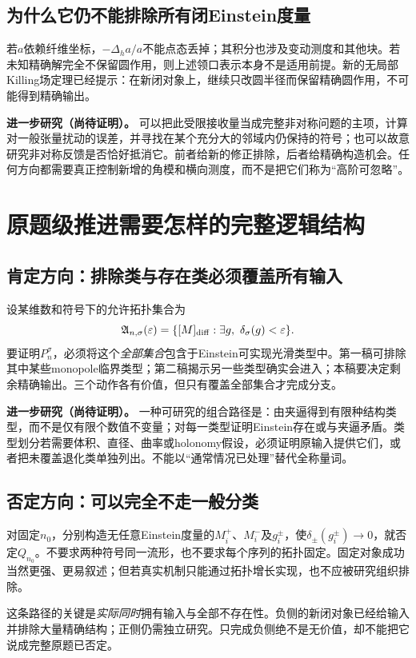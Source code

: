 \documentclass[UTF8,fontset=fandol,zihao=-4]{ctexart}
\theoremstyle{cn}
\newcommand{\newidea}{\par\noindent\textbf{进一步研究（尚待证明）。}}
\begin{document}
\subsection{为什么它仍不能排除所有闭Einstein度量}
若$a$依赖纤维坐标，$-\Delta_h a/a$不能点态丢掉；其积分也涉及变动测度和其他块。若未知精确解完全不保留圆作用，则上述领口表示本身不是适用前提。新的无局部Killing场定理已经提示：在新闭对象上，继续只改圆半径而保留精确圆作用，不可能得到精确输出。

\newidea
可以把此受限接收量当成完整非对称问题的主项，计算对一般张量扰动的误差，并寻找在某个充分大的邻域内仍保持的符号；也可以故意研究非对称反馈是否恰好抵消它。前者给新的修正排除，后者给精确构造机会。任何方向都需要真正控制新增的角模和横向测度，而不是把它们称为“高阶可忽略”。

\section{原题级推进需要怎样的完整逻辑结构}
\subsection{肯定方向：排除类与存在类必须覆盖所有输入}
设某维数和符号下的允许拓扑集合为
\[
 \mathfrak A_{n,\sigma}(\varepsilon)
 =\{[M]_{\rm diff}:\exists g,\ \delta_\sigma(g)<\varepsilon\}.
\]
要证明$P_n^\sigma$，必须将这个\emph{全部集合}包含于Einstein可实现光滑类型中。第一稿可排除其中某些monopole临界类型；第二稿揭示另一些类型确实会进入；本稿要决定剩余精确输出。三个动作各有价值，但只有覆盖全部集合才完成分支。

\newidea
一种可研究的组合路径是：由夹逼得到有限种结构类型，而不是仅有限个数值不变量；对每一类型证明Einstein存在或与夹逼矛盾。类型划分若需要体积、直径、曲率或holonomy假设，必须证明原输入提供它们，或者把未覆盖退化类单独列出。不能以“通常情况已处理”替代全称量词。

\subsection{否定方向：可以完全不走一般分类}
对固定$n_0$，分别构造无任意Einstein度量的$M_i^+$、$M_i^-$及$g_i^\pm$，使$\delta_\pm(g_i^\pm)\to0$，就否定$Q_{n_0}$。不要求两种符号同一流形，也不要求每个序列的拓扑固定。固定对象成功当然更强、更易叙述；但若真实机制只能通过拓扑增长实现，也不应被研究组织排除。

这条路径的关键是\emph{实际同时}拥有输入与全部不存在性。负侧的新闭对象已经给输入并排除大量精确结构；正侧仍需独立研究。只完成负侧绝不是无价值，却不能把它说成完整原题已否定。
\end{document}
